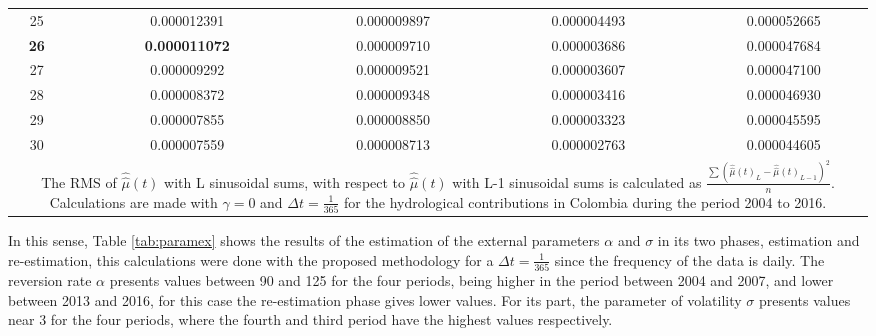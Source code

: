 \documentclass[12pt,halfline,a4paper]{ouparticle}
\begin{document}
\begin{table}[h]
\begin{tabular}{ccccccccc}
		25    &       & 0.000012391 &       & 0.000009897 &       & 0.000004493 &       & 0.000052665 \\
		\textbf{26} &       & \textbf{0.000011072} &       & 0.000009710 &       & 0.000003686 &       & 0.000047684 \\
		27    &       & 0.000009292 &       & 0.000009521 &       & 0.000003607 &       & 0.000047100 \\
		28    &       & 0.000008372 &       & 0.000009348 &       & 0.000003416 &       & 0.000046930 \\
		29    &       & 0.000007855 &       & 0.000008850 &       & 0.000003323 &       & 0.000045595 \\
		30    &       & 0.000007559 &       & 0.000008713 &       & 0.000002763 &       & 0.000044605 \\
		\bottomrule
		\bottomrule
		\multicolumn{9}{p{14.5cm}}{\footnotesize{The RMS of $\hat{\hat{\mu}}(t)$ with L sinusoidal sums, with respect to $\hat{\hat{\mu}}(t)$ with L-1 sinusoidal sums is calculated as $\frac{\sum (\hat{\hat{\mu}}(t)_{L}-\hat{\hat{\mu}}(t)_{L-1})^{2}}{n}$. Calculations are made with $\gamma=0$ and $\Delta t=\frac{1}{365}$ for the hydrological contributions in Colombia during the period 2004 to 2016.}}
	\end{tabular}
	\label{tab:sumcos}
\end{table}

In this sense, Table \ref{tab:paramex} shows the results of the estimation of the external parameters $\alpha$ and $\sigma$ in its two phases, estimation and re-estimation, this calculations were done with the proposed methodology for a $\Delta t=\frac{1}{365}$ since the frequency of the data is daily. The reversion rate $\alpha$ presents values between 90 and 125 for the four periods, being higher in the period between 2004 and 2007, and lower between 2013 and 2016, for this case the re-estimation phase gives lower values. For its part, the parameter of volatility $\sigma$ presents values near 3 for the four periods, where the fourth and third period have the highest values respectively.
\end{document}
